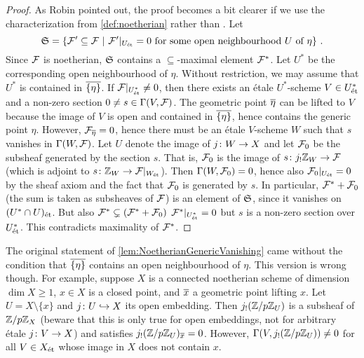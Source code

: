 \begin{proof}
	As Robin pointed out, the proof becomes a bit clearer if we use the characterization from \cref{def:noetherian} rather than . Let
	\begin{equation*}
		\mathfrak{S}=\left\{\mathcal{F}'\subseteq \mathcal{F}\ \middle|\  \mathcal{F}'|_{U_{\mathrm{\acute{e}t}}}=0\text{ for some open neighbourhood $U$ of $\eta$}\right\}\,.
	\end{equation*}
	Since $\mathcal{F}$ is noetherian, $\mathfrak{S}$ contains a $\subseteq$-maximal element $\mathcal{F}^*$. Let $U^*$ be the corresponding open neighbourhood of $\eta$. Without restriction, we may assume that $U^*$ is contained in $\ov{\{\eta\}}$. If $\mathcal{F}|_{U_{\mathrm{\acute{e}t}}^*}\neq 0$, then there exists an étale $U^*$-scheme $V\in U_{\mathrm{\acute{e}t}}^*$ and a non-zero section $0\neq s\in \operatorname{\Gamma}(V,\mathcal{F})$. The geometric point $\ov{\eta}$ can be lifted to $V$ because the image of $V$ is open and contained in $\ov{\{\eta\}}$, hence contains the generic point $\eta$. However, $\Ff_{\ov{\eta}}=0$, hence there must be an étale $V$-scheme $W$ such that $s$ vanishes in $\operatorname{\Gamma}(W,\mathcal{F})$. Let $U$ denote the image of $j\colon W\morphism X$ and let $\mathcal{F}_0$ be the subsheaf generated by the section $s$. That is, $\mathcal{F}_0$ is the image of $s\colon j_!\IZ_W\morphism \Ff$ (which is adjoint to $s\colon \IZ_W\morphism \Ff|_{W_\et}$). Then $\operatorname{\Gamma}(W,\mathcal{F}_0)=0$, hence also $\mathcal{F}_0|_{U_{\mathrm{\acute{e}t}}}=0$ by the sheaf axiom and the fact that $\mathcal{F}_0$ is generated by $s$. In particular, $\mathcal{F}^*+\mathcal{F}_0$ (the sum is taken as subsheaves of $\mathcal{F}$) is an element of $\mathfrak{S}$, since it vanishes on $(U^*\cap U)_{\mathrm{\acute{e}t}}$. But also $\mathcal{F}^*\subsetneq (\mathcal{F}^*+\mathcal{F}_0)$ $\mathcal{F}^*|_{U_{\mathrm{\acute{e}t}}^*}=0$ but $s$ is a non-zero section over $U_{\mathrm{\acute{e}t}}^*$. This contradicts maximality of $\mathcal{F}^*$.
\end{proof}
The original statement of \cref{lem:NoetherianGenericVanishing} came without the condition that $\ov{\{\eta\}}$ contains an open neighbourhood of $\eta$. This version is wrong though. For example, suppose $X$ is a connected noetherian scheme of dimension $\dim X\geq 1$, $x\in X$ is a closed point, and $\ov{x}$ a geometric point lifting $x$. Let $U=X\setminus \{x\}$ and $j\colon U\monomorphism X$ its open embedding. Then $j_!(\mathbb{Z}/p\mathbb{Z}_U)$ is a subsheaf of $\mathbb{Z}/p\mathbb{Z}_X$ (beware that this is only true for open embeddings, not for arbitrary étale $j\colon V\morphism X$) and satisfies $j_!(\IZ/p\IZ_U)_{\ov{x}}=0$. However, $\operatorname{\Gamma} (V,j_!(\mathbb{Z}/p\mathbb{Z}_U))\neq 0$ for all $V\in X_{\mathrm{\acute{e}t}}$ whose image in $X$ does not contain $x$.
